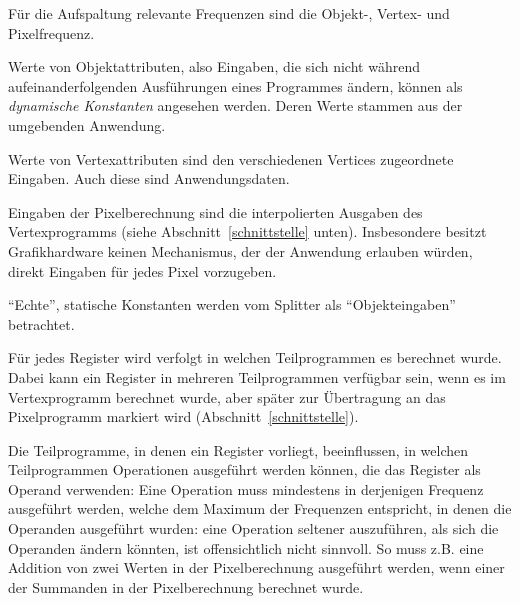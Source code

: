 \documentclass[twoside,a4paper,fleqn,12pt]{book}
\begin{document}
Für die Aufspaltung relevante Frequenzen sind die Objekt-, %
Vertex- und Pixelfrequenz.

Werte von Objektattributen, also Eingaben, die sich nicht während aufeinanderfolgenden Ausführungen eines Programmes
ändern, können als \emph{dynamische Konstanten} angesehen werden. Deren Werte stammen aus der umgebenden Anwendung.

Werte von Vertexattributen sind den verschiedenen Vertices zugeordnete Eingaben. %
Auch diese sind Anwendungsdaten.

Eingaben der Pixelberechnung sind die interpolierten Ausgaben des Vertexprogramms (siehe Abschnitt~\ref{schnittstelle} unten). 
Insbesondere besitzt Grafikhardware keinen Mechanismus, der der Anwendung erlauben würden, direkt Eingaben für jedes Pixel
vorzugeben.

"`Echte"', statische Konstanten werden vom Splitter als "`Objekteingaben"' betrachtet.

Für jedes Register wird verfolgt in welchen Teilprogrammen es berechnet wurde.
Dabei kann ein Register in mehreren Teilprogrammen verfügbar sein, wenn es im Vertexprogramm berechnet wurde, aber später 
zur Übertragung an das Pixelprogramm markiert wird (Abschnitt~\ref{schnittstelle}).


Die Teilprogramme, in denen ein Register vorliegt, beeinflussen, in welchen Teilprogrammen Operationen ausgeführt werden können,
die das Register als Operand verwenden: Eine Operation muss mindestens in derjenigen Frequenz ausgeführt werden, welche dem Maximum der Frequenzen
entspricht, in denen die Operanden ausgeführt wurden: eine Operation seltener auszuführen, als sich die Operanden ändern könnten, ist offensichtlich nicht sinnvoll.
So muss z.B. eine Addition von zwei Werten in der Pixelberechnung ausgeführt werden, wenn einer der Summanden in der Pixelberechnung berechnet wurde.
\end{document}
